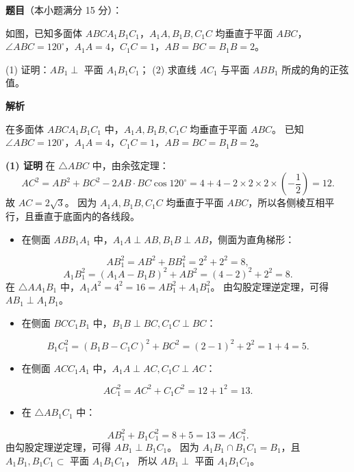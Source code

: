 \begin{answer}

\textbf{题目}（本小题满分 15 分）：

如图，已知多面体 $ABCA_1B_1C_1$，$A_1A, B_1B, C_1C$ 均垂直于平面 $ABC$，$\angle ABC = 120^\circ$，$A_1A = 4$，$C_1C = 1$，$AB = BC = B_1B = 2$。
\nopagebreak[4]
\begin{center}\end{center}
\nopagebreak[4]
(1) 证明：$AB_1 \perp$ 平面 $A_1B_1C_1$；
(2) 求直线 $AC_1$ 与平面 $ABB_1$ 所成的角的正弦值。

\textbf{解析}

在多面体 $ABCA_1B_1C_1$ 中，$A_1A, B_1B, C_1C$ 均垂直于平面 $ABC$。
已知 $\angle ABC = 120^\circ$，$A_1A = 4$，$C_1C = 1$，$AB = BC = B_1B = 2$。

\textbf{(1) 证明} 在 $\triangle ABC$ 中，由余弦定理：
\nopagebreak[4]
\[AC^2 = AB^2 + BC^2 - 2AB \cdot BC \cos 120^\circ = 4 + 4 - 2 \times 2 \times 2 \times \left(-\dfrac12\right) = 12.\]
故 $AC = 2\sqrt3$。
因为 $A_1A, B_1B, C_1C$ 均垂直于平面 $ABC$，所以各侧棱互相平行，且垂直于底面内的各线段。
\begin{itemize}
\item 在侧面 $ABB_1A_1$ 中，$A_1A \perp AB, B_1B \perp AB$，侧面为直角梯形：
\end{itemize}
\nopagebreak[4]
\[AB_1^2 = AB^2 + BB_1^2 = 2^2 + 2^2 = 8,\]
\nopagebreak[4]
\[A_1B_1^2 = (A_1A - B_1B)^2 + AB^2 = (4 - 2)^2 + 2^2 = 8.\]
  在 $\triangle AA_1B_1$ 中，$A_1A^2 = 4^2 = 16 = AB_1^2 + A_1B_1^2$。
  由勾股定理逆定理，可得 $AB_1 \perp A_1B_1$。
\begin{itemize}
\item 在侧面 $BCC_1B_1$ 中，$B_1B \perp BC, C_1C \perp BC$：
\end{itemize}
\nopagebreak[4]
\[B_1C_1^2 = (B_1B - C_1C)^2 + BC^2 = (2 - 1)^2 + 2^2 = 1 + 4 = 5.\]
\begin{itemize}
\item 在侧面 $ACC_1A_1$ 中，$A_1A \perp AC, C_1C \perp AC$：
\end{itemize}
\nopagebreak[4]
\[AC_1^2 = AC^2 + C_1C^2 = 12 + 1^2 = 13.\]
\begin{itemize}
\item 在 $\triangle AB_1C_1$ 中：
\end{itemize}
\nopagebreak[4]
\[AB_1^2 + B_1C_1^2 = 8 + 5 = 13 = AC_1^2.\]
  由勾股定理逆定理，可得 $AB_1 \perp B_1C_1$。
因为 $A_1B_1 \cap B_1C_1 = B_1$，且 $A_1B_1, B_1C_1 \subset$ 平面 $A_1B_1C_1$，
所以 $AB_1 \perp$ 平面 $A_1B_1C_1$。


\end{answer}
